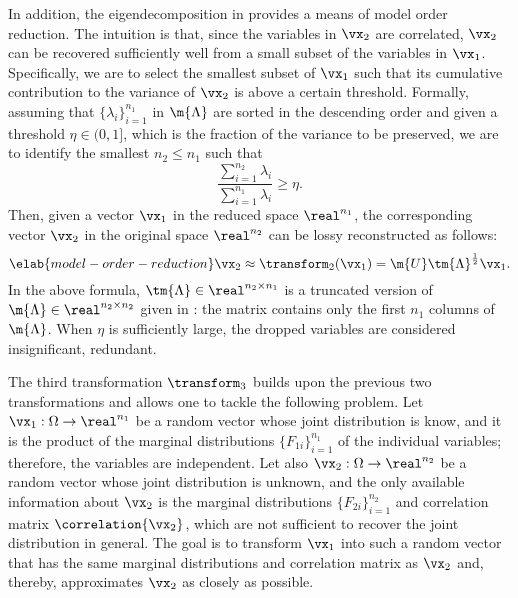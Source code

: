 In addition, the eigendecomposition in  provides a
means of model order reduction. The intuition is that, since the variables in
$\vx_2$ are correlated, $\vx_2$ can be recovered sufficiently well from a small
subset of the variables in $\vx_1$. Specifically, we are to select the smallest
subset of $\vx_1$ such that its cumulative contribution to the variance of
$\vx_2$ is above a certain threshold. Formally, assuming that $\{ \lambda_i
\}_{i = 1}^{n_1}$ in $\m{\Lambda}$ are sorted in the descending order and given
a threshold $\eta \in (0, 1]$, which is the fraction of the variance to be
preserved, we are to identify the smallest $n_2 \leq n_1$ such that
\[
  \frac{\sum_{i = 1}^{n_2} \lambda_i}{\sum_{i = 1}^{n_1} \lambda_i} \geq \eta.
\]
Then, given a vector $\vx_1$ in the reduced space $\real^{n_1}$, the
corresponding vector $\vx_2$ in the original space $\real^{n_2}$ can be lossy
reconstructed as follows:
\begin{equation} \elab{model-order-reduction}
  \vx_2 \approx \transform_2(\vx_1) = \m{U} \tm{\Lambda}^\frac{1}{2} \vx_1.
\end{equation}
In the above formula, $\tm{\Lambda} \in \real^{n_2 \times n_1}$ is a truncated
version of $\m{\Lambda} \in \real^{n_2 \times n_2}$ given in
: the matrix contains only the first $n_1$ columns of
$\m{\Lambda}$. When $\eta$ is sufficiently large, the dropped variables are
considered insignificant, redundant.

The third transformation $\transform_3$ builds upon the previous two
transformations and allows one to tackle the following problem. Let $\vx_1:
\Omega \to \real^{n_1}$ be a random vector whose joint distribution is know, and
it is the product of the marginal distributions $\{ F_{1i} \}_{i = 1}^{n_1}$ of
the individual variables; therefore, the variables are independent. Let also
$\vx_2: \Omega \to \real^{n_2}$ be a random vector whose joint distribution is
unknown, and the only available information about $\vx_2$ is the marginal
distributions $\{ F_{2i} \}_{i = 1}^{n_2}$ and correlation matrix
$\correlation{\vx_2}$, which are not sufficient to recover the joint
distribution in general. The goal is to transform $\vx_1$ into such a random
vector that has the same marginal distributions and correlation matrix as
$\vx_2$ and, thereby, approximates $\vx_2$ as closely as possible.

